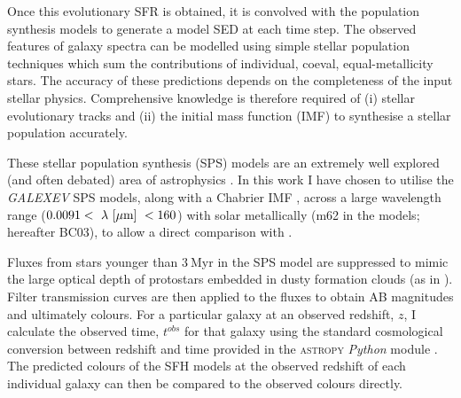 Once this evolutionary SFR is obtained, it is convolved with the \citet{BC03} population synthesis models to generate a model SED at each time step. The observed features of galaxy spectra can be modelled using simple stellar population techniques which sum the contributions of individual, coeval, equal-metallicity stars. The accuracy of these predictions depends on the completeness of the input stellar physics. Comprehensive knowledge is therefore required of (i) stellar evolutionary tracks and (ii) the initial mass function (IMF) to synthesise a stellar population accurately. 

These stellar population synthesis (SPS) models are an extremely well explored (and often debated) area of astrophysics \citep{Maraston05, Eminian08, CGW09, falkenberg09, Chen10, Kriek10, miner11, melbourne12}. In this work I have chosen to utilise the \citet{BC03} \emph{GALEXEV} SPS models, along with a Chabrier IMF \citep{chabrier03}, across a large wavelength range ($0.0091 < ~\lambda~\rm{[\mu m]}~ < 160 $) with solar metallically (m62 in the \citet{BC03} models; hereafter BC03), to allow a direct comparison with \citet{schawinski14}.


Fluxes from stars younger than $3~$Myr in the SPS model are suppressed to mimic the large optical depth of protostars embedded in dusty formation clouds (as in \citealt{schawinski14}).  Filter transmission curves are then applied to the fluxes to obtain AB magnitudes and ultimately colours.  For a particular galaxy at an observed redshift, $z$, I calculate the observed time, $t^{obs}$ for that galaxy using the standard cosmological conversion between redshift and time provided in the \textsc{astropy} {\em Python} module \citep{astropy13}. The predicted colours of the SFH models at the observed redshift of each individual galaxy can then be compared to the observed colours directly.

